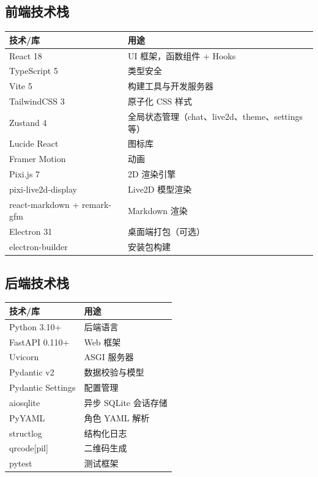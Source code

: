 \documentclass[12pt,a4paper]{article}
\begin{document}
\subsection{前端技术栈}

\begin{longtable}{p{3.5cm}p{9cm}}
\toprule
\textbf{技术/库} & \textbf{用途} \\
\midrule
\endhead
React 18 & UI 框架，函数组件 + Hooks \\
TypeScript 5 & 类型安全 \\
Vite 5 & 构建工具与开发服务器 \\
TailwindCSS 3 & 原子化 CSS 样式 \\
Zustand 4 & 全局状态管理（chat、live2d、theme、settings 等） \\
Lucide React & 图标库 \\
Framer Motion & 动画 \\
Pixi.js 7 & 2D 渲染引擎 \\
pixi-live2d-display & Live2D 模型渲染 \\
react-markdown + remark-gfm & Markdown 渲染 \\
Electron 31 & 桌面端打包（可选） \\
electron-builder & 安装包构建 \\
\bottomrule
\end{longtable}

\subsection{后端技术栈}

\begin{longtable}{p{3.5cm}p{9cm}}
\toprule
\textbf{技术/库} & \textbf{用途} \\
\midrule
\endhead
Python 3.10+ & 后端语言 \\
FastAPI 0.110+ & Web 框架 \\
Uvicorn & ASGI 服务器 \\
Pydantic v2 & 数据校验与模型 \\
Pydantic Settings & 配置管理 \\
aiosqlite & 异步 SQLite 会话存储 \\
PyYAML & 角色 YAML 解析 \\
structlog & 结构化日志 \\
qrcode[pil] & 二维码生成 \\
pytest & 测试框架 \\
\bottomrule
\end{longtable}
\end{document}
